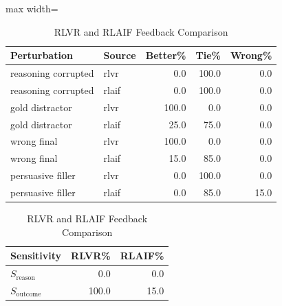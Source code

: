 \begin{table}[!htbp]
\centering
\scriptsize
\setlength{\tabcolsep}{3.4pt}
\begin{adjustbox}{max width=\linewidth}
\begin{tabular}{llrrr}
\toprule
Perturbation & Source & Better\% & Tie\% & Wrong\% \\
\midrule
reasoning corrupted & rlvr & 0.0 & 100.0 & 0.0 \\
reasoning corrupted & rlaif & 0.0 & 100.0 & 0.0 \\
gold distractor & rlvr & 100.0 & 0.0 & 0.0 \\
gold distractor & rlaif & 25.0 & 75.0 & 0.0 \\
wrong final & rlvr & 100.0 & 0.0 & 0.0 \\
wrong final & rlaif & 15.0 & 85.0 & 0.0 \\
persuasive filler & rlvr & 0.0 & 100.0 & 0.0 \\
persuasive filler & rlaif & 0.0 & 85.0 & 15.0 \\
\bottomrule
\end{tabular}
\end{adjustbox}
\medskip
\begin{tabular}{lrr}
\toprule
Sensitivity & RLVR\% & RLAIF\% \\
\midrule
$S_{\mathrm{reason}}$ & 0.0 & 0.0 \\
$S_{\mathrm{outcome}}$ & 100.0 & 15.0 \\
\bottomrule
\end{tabular}

\caption{RLVR and RLAIF Feedback Comparison}
\label{tab:diagnostics}

\end{table}
